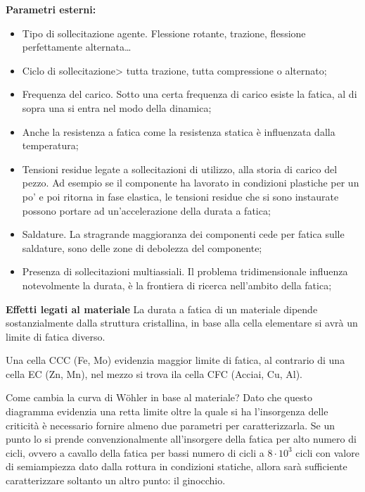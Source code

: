 \documentclass{article}
\begin{document}
\begin{adjustwidth}{2in}{}
 			\textbf{Parametri esterni:}
 			\begin{itemize}
 				\item Tipo di sollecitazione agente. Flessione rotante, trazione, flessione perfettamente alternata\dots 
 				\item Ciclo di sollecitazione> tutta trazione, tutta compressione o alternato; 
 				\item Frequenza del carico. Sotto una certa frequenza di carico esiste la fatica, al di sopra una si entra nel modo della dinamica;
 				\item Anche la resistenza a fatica come la resistenza statica è influenzata dalla temperatura;
 				\item Tensioni residue legate a sollecitazioni di utilizzo, alla storia di carico del pezzo. Ad esempio se il componente ha lavorato in condizioni plastiche per un po' e poi ritorna in fase elastica, le tensioni residue che si sono instaurate possono portare ad un'accelerazione della durata a fatica;
 				\item Saldature. La stragrande maggioranza dei componenti cede per fatica sulle saldature, sono delle zone di debolezza del componente;
 				\item Presenza di sollecitazioni multiassiali. Il problema tridimensionale influenza notevolmente la durata, è la frontiera di ricerca nell'ambito della fatica;
 			\end{itemize} 
 			\vspace{0.5cm}			
			\textbf{\Large Effetti legati al materiale} \newline
			La durata a fatica di un materiale dipende sostanzialmente dalla struttura cristallina, in base alla cella elementare si avrà un limite di fatica diverso. 
			
			Una cella CCC (Fe, Mo) evidenzia maggior limite di fatica, al contrario di una cella EC (Zn, Mn), nel mezzo si trova ila cella CFC (Acciai, Cu, Al). \newline
			
			Come cambia la curva di Wöhler in base al materiale? Dato che questo diagramma evidenzia una retta limite oltre la quale si ha l'insorgenza delle criticità è necessario fornire almeno due parametri per caratterizzarla. Se un punto lo si prende convenzionalmente all'insorgere della fatica per alto numero di cicli, ovvero a cavallo della fatica per bassi numero di cicli a $8\cdot10^3$ cicli con valore di semiampiezza dato dalla rottura in condizioni statiche, allora sarà sufficiente caratterizzare soltanto un altro punto: il ginocchio.
			

\end{adjustwidth}
\end{document}
